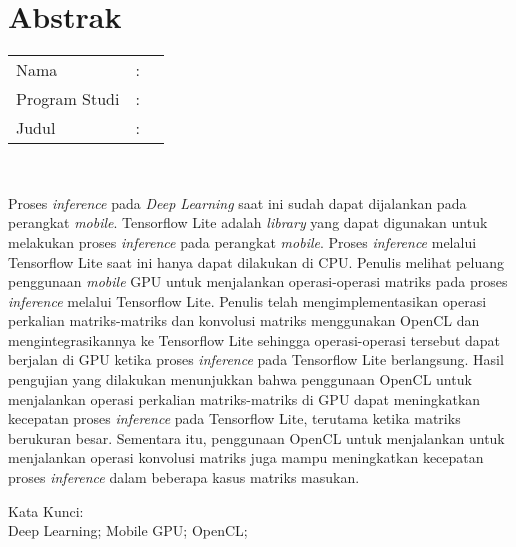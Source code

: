 %
%
%

\chapter*{Abstrak}

\vspace*{0.2cm}

\noindent \begin{tabular}{l l p{10cm}}
	Nama&: & \penulis \\
	Program Studi&: & \program \\
	Judul&: & \judul \\
\end{tabular} \\ 

\vspace*{0.5cm}

\noindent 
Proses \textit{inference} pada \textit{Deep Learning} saat ini sudah dapat dijalankan pada perangkat \textit{mobile}. Tensorflow Lite adalah \textit{library} yang dapat digunakan untuk melakukan proses \textit{inference} pada perangkat \textit{mobile}. Proses \textit{inference} melalui Tensorflow Lite saat ini hanya dapat dilakukan di CPU. Penulis melihat peluang penggunaan \textit{mobile} GPU untuk menjalankan operasi-operasi matriks pada proses \textit{inference} melalui Tensorflow Lite. Penulis telah mengimplementasikan operasi perkalian matriks-matriks dan konvolusi matriks menggunakan OpenCL dan mengintegrasikannya ke Tensorflow Lite sehingga operasi-operasi tersebut dapat berjalan di GPU ketika proses \textit{inference} pada Tensorflow Lite berlangsung. Hasil pengujian yang dilakukan menunjukkan bahwa penggunaan OpenCL untuk menjalankan operasi perkalian matriks-matriks di GPU dapat meningkatkan kecepatan proses \textit{inference} pada Tensorflow Lite, terutama ketika matriks berukuran besar. Sementara itu, penggunaan OpenCL untuk menjalankan untuk menjalankan operasi konvolusi matriks juga mampu meningkatkan kecepatan proses \textit{inference} dalam beberapa kasus matriks masukan.
\\

\vspace*{0.2cm}

\noindent Kata Kunci: \\ 
\noindent Deep Learning; Mobile GPU; OpenCL; \\

\newpage